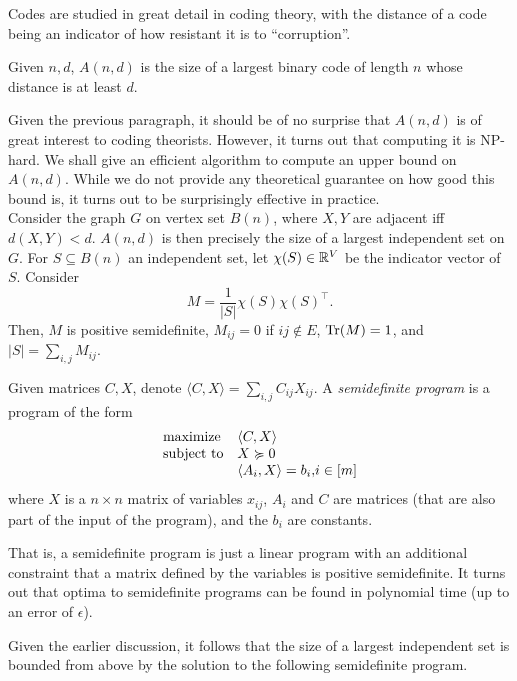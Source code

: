 	Codes are studied in great detail in coding theory, with the distance of a code being an indicator of how resistant it is to ``corruption''.

	\begin{fdef}
		Given $n,d$, $A(n,d)$ is the size of a largest binary code of length $n$ whose distance is at least $d$.
	\end{fdef}

	Given the previous paragraph, it should be of no surprise that $A(n,d)$ is of great interest to coding theorists. However, it turns out that computing it is \textsf{NP}-hard. We shall give an efficient algorithm to compute an upper bound on $A(n,d)$. While we do not provide any theoretical guarantee on how good this bound is, it turns out to be surprisingly effective in practice.\\

	Consider the graph $G$ on vertex set $B(n)$, where $X,Y$ are adjacent iff $d(X,Y) < d$. $A(n,d)$ is then precisely the size of a largest independent set on $G$. For $S \subseteq B(n)$ an independent set, let $\chi(S) \in \mathbb{R}^V$ be the indicator vector of $S$. Consider
	\[ M = \frac{1}{|S|} \chi(S) \chi(S)^\top. \]
	Then, $M$ is positive semidefinite, $M_{ij} = 0$ if $ij \not\in E$, $\operatorname{Tr}(M) = 1$, and $|S| = \sum_{i,j} M_{ij}$.

	\begin{fdef}
		Given matrices $C,X$, denote $\langle C,X\rangle = \sum_{i,j} C_{ij} X_{ij}$. A \emph{semidefinite program} is a program of the form
		\[
		\label{def:sdp}
		\begin{array}{ll@{}ll}
		\text{maximize}  & \displaystyle\langle C,X\rangle &\\
		\text{subject to} \displaystyle &X \pge 0  &\\
		& \displaystyle \langle A_i,X\rangle = b_i, & i \in [m]
		\end{array}
		\]
		where $X$ is a $n \times n$ matrix of variables $x_{ij}$, $A_i$ and $C$ are matrices (that are also part of the input of the program), and the $b_i$ are constants.
	\end{fdef}
	That is, a semidefinite program is just a linear program with an additional constraint that a matrix defined by the variables is positive semidefinite. It turns out that optima to semidefinite programs can be found in polynomial time (up to an error of $\epsilon$).

	Given the earlier discussion, it follows that the size of a largest independent set is bounded from above by the solution to the following semidefinite program.

